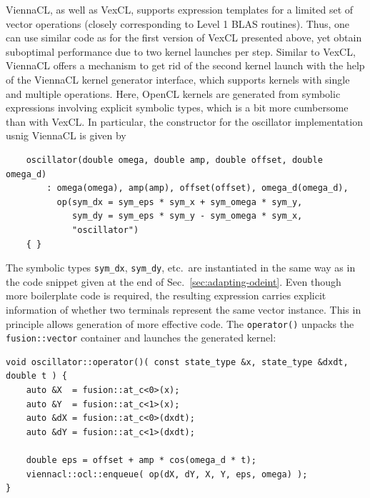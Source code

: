 \documentclass[final]{siamltex}
\newcommand{\code}[1]{\lstinline|#1|}
\begin{document}
ViennaCL, as well as VexCL, supports expression templates for a limited set of    %
vector operations (closely corresponding to Level 1 BLAS routines).
Thus, one can use similar code as for the first version of VexCL presented above,
yet obtain suboptimal performance due to two kernel launches per step.
Similar to VexCL, ViennaCL offers a mechanism to get rid of the second kernel launch
with the help of the ViennaCL kernel generator interface, which supports kernels with single and multiple operations.
Here, OpenCL kernels are generated from symbolic expressions involving explicit symbolic types,
which is a bit more cumbersome than with VexCL. In particular, the constructor
for the oscillator implementation usnig ViennaCL is given by
%
%
%
\begin{lstlisting}
    oscillator(double omega, double amp, double offset, double omega_d)
        : omega(omega), amp(amp), offset(offset), omega_d(omega_d),
          op(sym_dx = sym_eps * sym_x + sym_omega * sym_y,
             sym_dy = sym_eps * sym_y - sym_omega * sym_x,
             "oscillator")
    { }
\end{lstlisting}
%
The symbolic types \code{sym_dx}, \code{sym_dy}, etc.~are instantiated in the same way
as in the code snippet given at the end of Sec.~\ref{sec:adapting-odeint}.
Even though more boilerplate code is required, the resulting expression 
carries explicit information of whether two terminals represent the same vector
instance. This in principle allows generation of more effective code. The
\code{operator()} unpacks the \code{fusion::vector} container and launches
the generated kernel:
\begin{lstlisting}
void oscillator::operator()( const state_type &x, state_type &dxdt, double t ) {
    auto &X  = fusion::at_c<0>(x);
    auto &Y  = fusion::at_c<1>(x);
    auto &dX = fusion::at_c<0>(dxdt);
    auto &dY = fusion::at_c<1>(dxdt);

    double eps = offset + amp * cos(omega_d * t);
    viennacl::ocl::enqueue( op(dX, dY, X, Y, eps, omega) );
}
\end{lstlisting}
\end{document}
